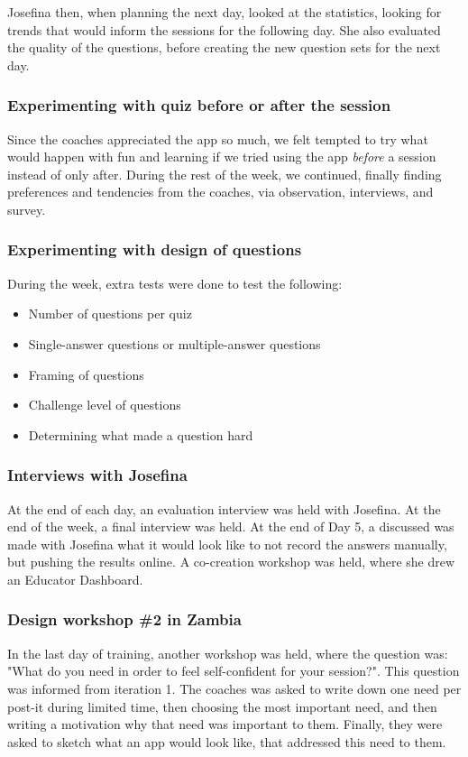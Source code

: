 Josefina then, when planning the next day, looked at the statistics, looking for trends that would inform the sessions for the following day. She also evaluated the quality of the questions, before creating the new question sets for the next day.

\subsubsection{Experimenting with quiz before or after the session}
Since the coaches appreciated the app so much, we felt tempted to try what would happen with fun and learning if we tried using the app \textit{before} a session instead of only after. During the rest of the week, we continued, finally finding preferences and tendencies from the coaches, via observation, interviews, and survey.

\subsubsection{Experimenting with design of questions}
During the week, extra tests were done to test the following:

\begin{itemize}
\item Number of questions per quiz
\item Single-answer questions or multiple-answer questions
\item Framing of questions
\item Challenge level of questions
\item Determining what made a question hard
\end{itemize}

\subsubsection{Interviews with Josefina}
At the end of each day, an evaluation interview was held with Josefina. At the end of the week, a final interview was held. At the end of Day 5, a discussed was made with Josefina what it would look like to not record the answers manually, but pushing the results online. A co-creation workshop was held, where she drew an Educator Dashboard.

\subsubsection{Design workshop \#2 in Zambia}
In the last day of training, another workshop was held, where the question was: "What do you need in order to feel self-confident for your session?". This question was informed from iteration 1. The coaches was asked to write down one need per post-it during limited time, then choosing the most important need, and then writing a motivation why that need was important to them. Finally, they were asked to sketch what an app would look like, that addressed this need to them.
